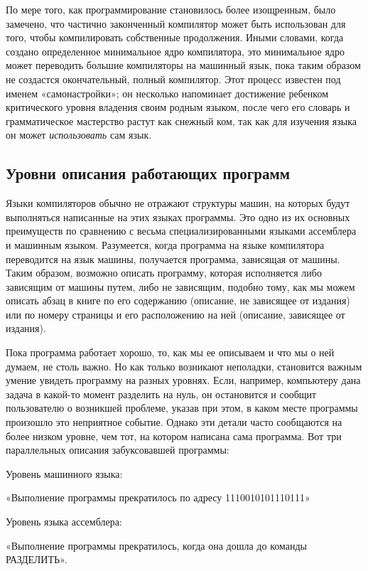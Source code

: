 \documentclass[../main.tex]{subfiles}
\begin{document}
По мере того, как программирование становилось более изощренным, было замечено, что частично законченный компилятор может быть использован для того, чтобы компилировать собственные продолжения. Иными словами, когда создано определенное минимальное ядро компилятора, это минимальное ядро может переводить большие компиляторы на машинный язык, пока таким образом не создастся окончательный, полный компилятор. Этот процесс известен под именем «самонастройки»; он несколько напоминает достижение ребенком критического уровня владения своим родным языком, после чего его словарь и грамматическое мастерство растут как снежный ком, так как для изучения языка он может \emph{использовать} сам язык.


\subsection{Уровни описания работающих программ}

Языки компиляторов обычно не отражают структуры машин, на которых будут выполняться написанные на этих языках программы. Это одно из их основных преимуществ по сравнению с весьма специализированными языками ассемблера и машинным языком. Разумеется, когда программа на языке компилятора переводится на язык машины, получается программа, зависящая от машины. Таким образом, возможно описать программу, которая исполняется либо зависящим от машины путем, либо не зависящим, подобно тому, как мы можем описать абзац в книге по его содержанию (описание, не зависящее от издания) или по номеру страницы и его расположению на ней (описание, зависящее от издания).

Пока программа работает хорошо, то, как мы ее описываем и что мы о ней думаем, не столь важно. Но как только возникают неполадки, становится важным умение увидеть программу на разных уровнях. Если, например, компьютеру дана задача в какой-то момент разделить на нуль, он остановится и сообщит пользователю о возникшей проблеме, указав при этом, в каком месте программы произошло это неприятное событие. Однако эти детали часто сообщаются на более низком уровне, чем тот, на котором написана сама программа. Вот три параллельных описания забуксовавшей программы:

Уровень машинного языка:

«Выполнение программы прекратилось по адресу 1110010101110111»

Уровень языка ассемблера:

«Выполнение программы прекратилось, когда она дошла до команды РАЗДЕЛИТЬ».
\end{document}
